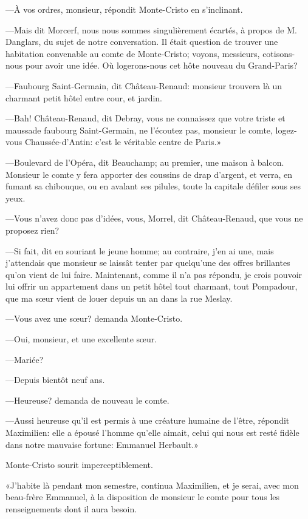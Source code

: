 —À vos ordres, monsieur, répondit Monte-Cristo en s'inclinant. 

—Mais dit Morcerf, nous nous sommes singulièrement écartés, à propos de M. Danglars, du sujet de notre conversation. Il était question de trouver une habitation convenable au comte de Monte-Cristo; voyons, messieurs, cotisons-nous pour avoir une idée. Où logerons-nous cet hôte nouveau du Grand-Paris? 

—Faubourg Saint-Germain, dit Château-Renaud: monsieur trouvera là un charmant petit hôtel entre cour, et jardin. 

—Bah! Château-Renaud, dit Debray, vous ne connaissez que votre triste et maussade faubourg Saint-Germain, ne l'écoutez pas, monsieur le comte, logez-vous Chaussée-d'Antin: c'est le véritable centre de Paris.» 

—Boulevard de l'Opéra, dit Beauchamp; au premier, une maison à balcon. Monsieur le comte y fera apporter des coussins de drap d'argent, et verra, en fumant sa chibouque, ou en avalant ses pilules, toute la capitale défiler sous ses yeux. 

—Vous n'avez donc pas d'idées, vous, Morrel, dit Château-Renaud, que vous ne proposez rien? 

—Si fait, dit en souriant le jeune homme; au contraire, j'en ai une, mais j'attendais que monsieur se laissât tenter par quelqu'une des offres brillantes qu'on vient de lui faire. Maintenant, comme il n'a pas répondu, je crois pouvoir lui offrir un appartement dans un petit hôtel tout charmant, tout Pompadour, que ma sœur vient de louer depuis un an dans la rue Meslay. 

—Vous avez une sœur? demanda Monte-Cristo. 

—Oui, monsieur, et une excellente sœur. 

—Mariée? 

—Depuis bientôt neuf ans. 

—Heureuse? demanda de nouveau le comte. 

—Aussi heureuse qu'il est permis à une créature humaine de l'être, répondit Maximilien: elle a épousé l'homme qu'elle aimait, celui qui nous est resté fidèle dans notre mauvaise fortune: Emmanuel Herbault.» 

Monte-Cristo sourit imperceptiblement. 

«J'habite là pendant mon semestre, continua Maximilien, et je serai, avec mon beau-frère Emmanuel, à la disposition de monsieur le comte pour tous les renseignements dont il aura besoin. 

